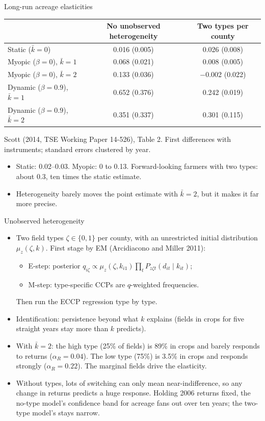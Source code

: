 \documentclass[aspectratio=169,11pt]{beamer}
\begin{document}
\begin{frame}{Long-run acreage elasticities}
\small
\begin{center}
\begin{tabular}{lcc}
\toprule
 & No unobserved heterogeneity & Two types per county\\
\midrule
Static ($\bar k = 0$) & 0.016 (0.005) & 0.026 (0.008)\\
Myopic ($\beta = 0$), $\bar k = 1$ & 0.068 (0.021) & 0.008 (0.005)\\
Myopic ($\beta = 0$), $\bar k = 2$ & 0.133 (0.036) & $-$0.002 (0.022)\\
Dynamic ($\beta = 0.9$), $\bar k = 1$ & 0.652 (0.376) & 0.242 (0.019)\\
Dynamic ($\beta = 0.9$), $\bar k = 2$ & 0.351 (0.337) & 0.301 (0.115)\\
\bottomrule
\end{tabular}
\end{center}
{\footnotesize Scott (2014, TSE Working Paper 14-526), Table 2. First differences with instruments; standard errors clustered by year.\par}
\begin{itemize}
\item Static: 0.02--0.03. Myopic: 0 to 0.13. Forward-looking farmers with two types: about \alert{0.3}, ten times the static estimate.
\item Heterogeneity barely moves the point estimate with $\bar k = 2$, but it makes it far more precise.
\end{itemize}
\end{frame}

\begin{frame}{Unobserved heterogeneity}
\small
\begin{itemize}
\item Two field types $\zeta \in \{0,1\}$ per county, with an unrestricted initial distribution $\mu_z(\zeta, k)$. First stage by EM (Arcidiacono and Miller 2011):
\begin{itemize}
\item E-step: posterior $q_{i\zeta} \propto \mu_z(\zeta, k_{i1}) \prod_t P_{z\zeta t}(d_{it} \mid k_{it})$;
\item M-step: type-specific CCPs are $q$-weighted frequencies.
\end{itemize}
Then run the ECCP regression type by type.
\item Identification: persistence beyond what $k$ explains (fields in crops for five straight years stay more than $k$ predicts).
\item With $\bar k = 2$: the high type (25\% of fields) is 89\% in crops and barely responds to returns ($\alpha_R = 0.04$). The low type (75\%) is 3.5\% in crops and responds strongly ($\alpha_R = 0.22$). The marginal fields drive the elasticity.
\item Without types, lots of switching can only mean near-indifference, so any change in returns predicts a huge response. Holding 2006 returns fixed, the no-type model's confidence band for acreage fans out over ten years; the two-type model's stays narrow.
\end{itemize}
\end{frame}
\end{document}
